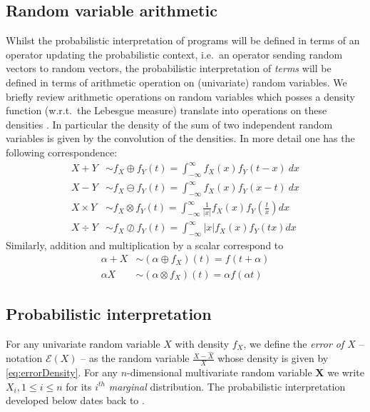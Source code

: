 \documentclass[10pt,conference]{IEEEtran}
\newcommand{\ie}{i.e.\ }
\newcommand{\wrt}{w.r.t.\ }
\newcommand{\Err}{\mathcal{E}}
\newcommand{\absv}[1]{\vert #1\vert}
\begin{document}
\subsection{Random variable arithmetic}\label{subsec:rvarithmetic}

Whilst the probabilistic interpretation of programs will be defined in terms of an operator updating the probabilistic context, \ie an operator sending random vectors to random vectors, the probabilistic interpretation of \emph{terms} will be defined in terms of arithmetic operation on (univariate) random variables. We briefly review arithmetic operations on random variables which posses a density function (\wrt the Lebesgue measure) translate into operations on these densities \cite{springer1979algebra}. In particular the density of the sum of two independent random variables is given by the convolution of the densities. In more detail one has the following correspondence:
\begin{align}
X+Y&\sim f_X\oplus f_Y(t)=\int_{-\infty}^{\infty} f_X(x)f_Y(t-x)~dx\label{eq:pdfplus}\\
X-Y&\sim f_X\ominus f_Y(t)=\int_{-\infty}^{\infty} f_X(x)f_Y(x-t)~dx\label{eq:pdfminus}\\
X\times Y&\sim f_X\otimes f_Y(t)=\int_{-\infty}^{\infty} \frac{1}{\absv{x}}f_X(x)f_Y\left(\frac{t}{x}\right)dx\label{eq:pdftimes}\\
X\div Y&\sim f_X\oslash f_Y(t)=\int_{-\infty}^{\infty} \absv{x}f_X(x)f_Y(tx)dx\label{eq:pdfdiv}
\end{align}
Similarly, addition and multiplication by a scalar correspond to
\begin{align*}
\alpha+X&\sim (\alpha\oplus f_X)(t)=f(t+\alpha)\\
\alpha X&\sim (\alpha\otimes f_X)(t)=\alpha f(\alpha t)
\end{align*}

\subsection{Probabilistic interpretation}\label{subsec:sem}

For any univariate random variable $X$ with density $f_X$, we define the \emph{error of $X$} -- notation $\Err(X)$ -- as the random variable $\frac{X-\widehat{X}}{X}$ whose density is given by \cref{eq:errorDensity}. For any $n$-dimensional multivariate random variable $\mathbf{X}$ we write $X_i, 1\leq i\leq n$ for its $i^{th}$ \emph{marginal} distribution. The probabilistic interpretation developed below dates back to  \cite{K81c}.
\end{document}

